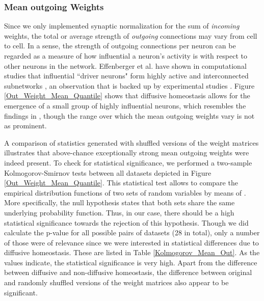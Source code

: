 \documentclass[10pt,a4paper]{article}
\begin{document}
\subsubsection{Mean outgoing Weights}\label{Section_Mean_outgoing_Weights}
Since we only implemented synaptic normalization for the sum of \emph{incoming} weights, the total or average strength of \emph{outgoing} connections may vary from cell to cell. In a sense, the strength of outgoing connections per neuron can be regarded as a measure of how influential a neuron's activity is with respect to other neurons in the network. Effenberger et al. have shown in computational studies that influential ``driver neurons" form highly active and interconnected subnetworks \cite{Effenberger_2015}, an observation that is backed up by experimental studies \cite{Yassin_Subnetworks_2010,Eckmann_Leader_Neurons_2008}. Figure \ref{Out_Weight_Mean_Quantile} shows that diffusive homeostasis allows for the emergence of a small group of highly influential neurons, which resembles the findings in \cite{Effenberger_2015}, though the range over which the mean outgoing weights vary is not as prominent.

A comparison of statistics generated with shuffled versions of the weight matrices illustrates that above-chance exceptionally strong mean outgoing weights were indeed present. To check for statistical significance, we performed a two-sample Kolmogorov-Smirnov tests between all datasets depicted in Figure \ref{Out_Weight_Mean_Quantile}. This statistical test allows to compare the empirical distribution functions of two sets of random variables by means of . More specifically, the null hypothesis states that both sets share the same underlying probability function. Thus, in our case, there should be a high statistical significance towards the rejection of this hypothesis. Though we did calculate the p-value for all possible pairs of datasets (28 in total), only a number of those were of relevance since we were interested in statistical differences due to diffusive homeostasis. These are listed in Table \ref{Kolmogorov_Mean_Out}. As the values indicate, the statistical significance is very high. Apart from the difference between diffusive and non-diffusive homeostasis, the difference between original and randomly shuffled versions of the weight matrices also appear to be significant. 
\end{document}
